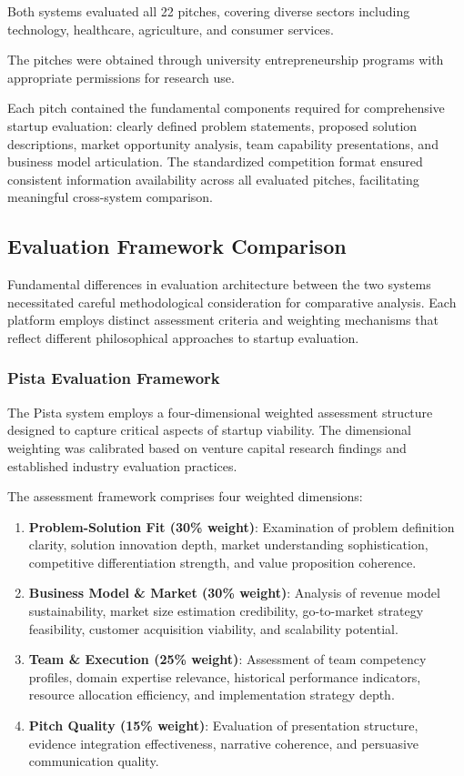 Both systems evaluated all 22 pitches, covering diverse sectors including technology, healthcare, agriculture, and consumer services.

The pitches were obtained through university entrepreneurship programs with appropriate permissions for research use.

Each pitch contained the fundamental components required for comprehensive startup evaluation: clearly defined problem statements, proposed solution descriptions, market opportunity analysis, team capability presentations, and business model articulation. The standardized competition format ensured consistent information availability across all evaluated pitches, facilitating meaningful cross-system comparison.

\subsection{Evaluation Framework Comparison}
\label{subsec:frameworks}

Fundamental differences in evaluation architecture between the two systems necessitated careful methodological consideration for comparative analysis. Each platform employs distinct assessment criteria and weighting mechanisms that reflect different philosophical approaches to startup evaluation.

\subsubsection{Pista Evaluation Framework}

The Pista system employs a four-dimensional weighted assessment structure designed to capture critical aspects of startup viability. The dimensional weighting was calibrated based on venture capital research findings and established industry evaluation practices.

The assessment framework comprises four weighted dimensions:
\begin{enumerate}
    \item \textbf{Problem-Solution Fit (30\% weight)}: Examination of problem definition clarity, solution innovation depth, market understanding sophistication, competitive differentiation strength, and value proposition coherence.

    \item \textbf{Business Model \& Market (30\% weight)}: Analysis of revenue model sustainability, market size estimation credibility, go-to-market strategy feasibility, customer acquisition viability, and scalability potential.

    \item \textbf{Team \& Execution (25\% weight)}: Assessment of team competency profiles, domain expertise relevance, historical performance indicators, resource allocation efficiency, and implementation strategy depth.

    \item \textbf{Pitch Quality (15\% weight)}: Evaluation of presentation structure, evidence integration effectiveness, narrative coherence, and persuasive communication quality.
\end{enumerate}

